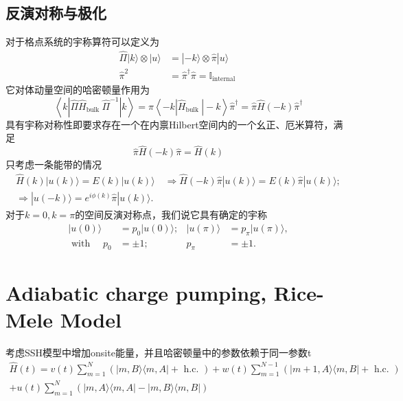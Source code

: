 \documentclass[12pt, a4paper, oneside]{ctexbook}
\begin{document}
\section{反演对称与极化}
对于格点系统的宇称算符可以定义为
\begin{equation}
	\begin{aligned}
		\hat{\Pi}|k\rangle \otimes|u\rangle & =|-k\rangle \otimes \hat{\pi}|u\rangle \\
		\hat{\pi}^2 & =\hat{\pi}^{\dagger} \hat{\pi}=\mathbb{I}_{\text {internal }}
		\end{aligned}
\end{equation}
它对体动量空间的哈密顿量作用为
\begin{equation}
	\left\langle k\left|\hat{\Pi}\hat{H}_{\text {bulk }}\hat{\Pi}^{-1}\right| k\right\rangle =\hat{\pi}\left\langle-k\left| \hat{H}_{\text {bulk }} \right|-k\right\rangle\hat{\pi}^\dagger=\hat{\pi} \hat{H}(-k) \hat{\pi}^{\dagger}
\end{equation}
具有宇称对称性即要求存在一个在内禀Hilbert空间内的一个幺正、厄米算符，满足
\begin{equation}
	\hat{\pi} \hat{H}(-k) \hat{\pi}=\hat{H}(k)
\end{equation}
只考虑一条能带的情况
\begin{equation}
	\begin{aligned}
		\hat{H}(k)|u(k)\rangle=E(k)|u(k)\rangle \quad \Longrightarrow \hat{H}(-k) \hat{\pi}|u(k)\rangle=E(k) \hat{\pi}|u(k)\rangle ; \\
		\Longrightarrow|u(-k)\rangle=e^{i \phi(k)} \hat{\pi}|u(k)\rangle .
		\end{aligned}
\end{equation}
对于$k=0,k=\pi $的空间反演对称点，我们说它具有确定的宇称
\begin{equation}
	\begin{aligned}
		|u(0)\rangle & =p_0|u(0)\rangle ; & |u(\pi)\rangle & =p_\pi|u(\pi)\rangle, \\
		\text { with } \quad p_0 & = \pm 1 ; & p_\pi & = \pm 1 .
		\end{aligned}
\end{equation}
\chapter{Adiabatic charge pumping, Rice-Mele Model}
考虑SSH模型中增加onsite能量，并且哈密顿量中的参数依赖于同一参数t
\begin{equation}
	\begin{array}{r}
		\hat{H}(t)=v(t) \sum_{m=1}^N(|m, B\rangle\langle m, A|+\text { h.c. })+w(t) \sum_{m=1}^{N-1}(|m+1, A\rangle\langle m, B|+\text { h.c. }) \\
		+u(t) \sum_{m=1}^N(|m, A\rangle\langle m, A|-| m, B\rangle\langle m, B|)
		\end{array}
\end{equation}

	
	
\end{document}

